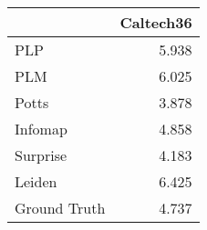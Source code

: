 \begin{tabular}{lr}
\toprule
{} & Caltech36 \\
\midrule
PLP          &     5.938 \\
PLM          &     6.025 \\
Potts        &     3.878 \\
Infomap      &     4.858 \\
Surprise     &     4.183 \\
Leiden       &     6.425 \\
Ground Truth &     4.737 \\
\bottomrule
\end{tabular}
